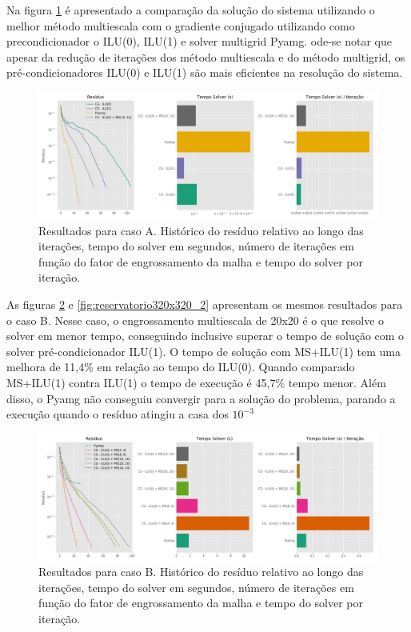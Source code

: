 Na figura \ref{fig:reservatorio100x100_2} é apresentado a comparação da solução do sistema utilizando o melhor método multiescala com o gradiente conjugado 
utilizando como precondicionador o ILU(0), ILU(1) e solver multigrid Pyamg. 
ode-se notar que apesar da redução de iterações dos método multiescala e do método multigrid, os pré-condicionadores ILU(0) e ILU(1) são mais eficientes na resolução do sistema. 


\begin{figure}[!htbp]
\caption{Resultados para caso A. Histórico do resíduo relativo ao longo das iterações, tempo do solver em segundos, número de iterações em função do fator de engrossamento da malha e tempo do solver por iteração. }
\label{fig:reservatorio100x100_2}
\centering
\includegraphics[width=\textwidth]{chap08/figs/reservatorio100x100_2.png}
\end{figure}


As figuras \ref{fig:reservatorio320x320_1} e \ref{fig:reservatorio320x320_2} apresentam os mesmos resultados para o caso B.
Nesse caso, o engrossamento multiescala de 20x20 é o que resolve o solver em menor tempo, conseguindo inclusive superar o tempo de solução com o solver pré-condicionador ILU(1).
O tempo de solução com MS+ILU(1) tem uma melhora de 11,4\% em relação ao tempo do ILU(0). Quando comparado MS+ILU(1) contra ILU(1) o tempo de execução é 45,7\% tempo menor.
Além disso, o Pyamg não conseguiu convergir para a solução do problema, parando a execução quando o resíduo atingiu a casa dos $10^{-3}$


\begin{figure}[!htbp]
\caption{Resultados para caso B. Histórico do resíduo relativo ao longo das iterações, tempo do solver em segundos, número de iterações em função do fator de engrossamento da malha e tempo do solver por iteração. }
\label{fig:reservatorio320x320_1}
\centering
\includegraphics[width=\textwidth]{chap08/figs/reservatorio320x320_1.png}
\end{figure}


